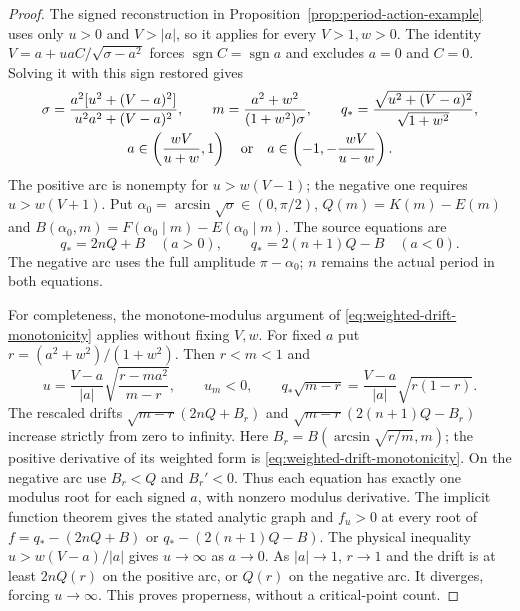 \documentclass[11pt,a4paper]{article}
\theoremstyle{remark}\newtheorem{remark}[theorem]{Remark}
\begin{document}
\begin{proof}
The signed reconstruction in Proposition~\ref{prop:period-action-example}
uses only $u>0$ and $V>|a|$, so it applies for every $V>1,w>0$.
The identity $V=a+uaC/\sqrt{\sigma-a^2}$ forces $\operatorname{sgn}C
=\operatorname{sgn}a$ and excludes $a=0$ and $C=0$. Solving it with
this sign restored gives
\begin{equation}\label{eq:general-signed-source}
 \begin{gathered}
 \sigma=\frac{a^2[u^2+(V-a)^2]}{u^2a^2+(V-a)^2},\qquad
 m=\frac{a^2+w^2}{(1+w^2)\sigma},\qquad
 q_* =\frac{\sqrt{u^2+(V-a)^2}}{\sqrt{1+w^2}},\\
 a\in\left(\frac{wV}{u+w},1\right)
 \quad\hbox{or}\quad
 a\in\left(-1,-\frac{wV}{u-w}\right).
 \end{gathered}
\end{equation}
The positive arc is nonempty for $u>w(V-1)$; the negative one requires
$u>w(V+1)$. Put $\alpha_0=\arcsin\sqrt\sigma\in(0,\pi/2)$,
$Q(m)=K(m)-E(m)$ and $B(\alpha_0,m)=F(\alpha_0\mid m)-E(\alpha_0\mid m)$.
The source equations are
\begin{equation}\label{eq:general-signed-drift}
 q_*=2nQ+B\quad(a>0),\qquad
 q_*=2(n+1)Q-B\quad(a<0).
\end{equation}
The negative arc uses the full amplitude $\pi-\alpha_0$; $n$ remains
the actual period in both equations.

For completeness, the monotone-modulus argument of
\eqref{eq:weighted-drift-monotonicity} applies without fixing $V,w$.
For fixed $a$ put $r=(a^2+w^2)/(1+w^2)$. Then $r<m<1$ and
\[
 u=\frac{V-a}{|a|}\sqrt{\frac{r-ma^2}{m-r}},\qquad u_m<0,
 \qquad q_*\sqrt{m-r}
 =\frac{V-a}{|a|}\sqrt{r(1-r)}.
\]
The rescaled drifts $\sqrt{m-r}(2nQ+B_r)$ and
$\sqrt{m-r}(2(n+1)Q-B_r)$ increase strictly from zero to infinity.
Here $B_r=B(\arcsin\sqrt{r/m},m)$; the positive derivative of its weighted
form is \eqref{eq:weighted-drift-monotonicity}. On the negative arc use
$B_r<Q$ and $B_r'<0$. Thus each equation has exactly one modulus root
for each signed $a$, with nonzero modulus derivative. The implicit
function theorem gives the stated analytic graph and $f_u>0$ at every
root of $f=q_*-(2nQ+B)$ or $q_*-(2(n+1)Q-B)$.
The physical inequality $u>w(V-a)/|a|$ gives $u\to\infty$ as $a\to0$.
As $|a|\to1$, $r\to1$ and the drift is at least $2nQ(r)$ on the positive
arc, or $Q(r)$ on the negative arc. It diverges, forcing $u\to\infty$.
This proves properness, without a critical-point count.


\end{proof}
\end{document}
